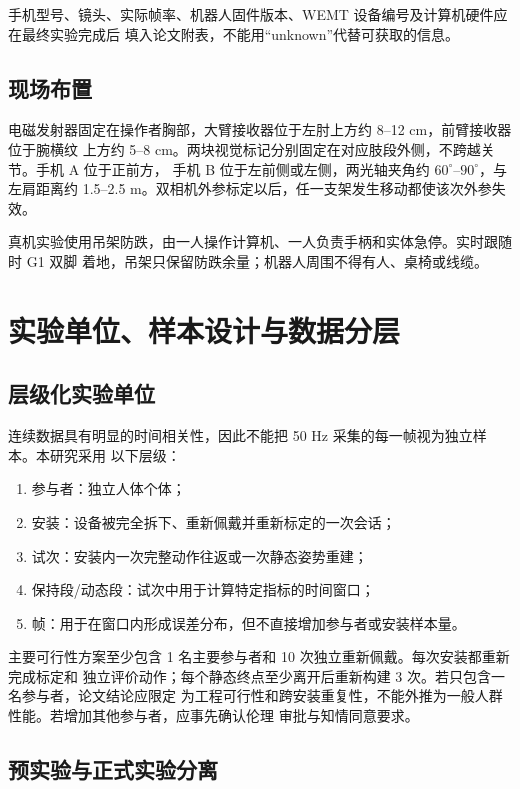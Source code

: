 手机型号、镜头、实际帧率、机器人固件版本、WEMT 设备编号及计算机硬件应在最终实验完成后
填入论文附表，不能用“unknown”代替可获取的信息。

\subsection{现场布置}
\label{subsec:ch6_physical_layout}

电磁发射器固定在操作者胸部，大臂接收器位于左肘上方约 8--12 cm，前臂接收器位于腕横纹
上方约 5--8 cm。两块视觉标记分别固定在对应肢段外侧，不跨越关节。手机 A 位于正前方，
手机 B 位于左前侧或左侧，两光轴夹角约 $60^\circ$--$90^\circ$，与左肩距离约
1.5--2.5 m。双相机外参标定以后，任一支架发生移动都使该次外参失效。

真机实验使用吊架防跌，由一人操作计算机、一人负责手柄和实体急停。实时跟随时 G1 双脚
着地，吊架只保留防跌余量；机器人周围不得有人、桌椅或线缆。

\section{实验单位、样本设计与数据分层}
\label{sec:ch6_sampling_design}

\subsection{层级化实验单位}
\label{subsec:ch6_hierarchical_units}

连续数据具有明显的时间相关性，因此不能把 50 Hz 采集的每一帧视为独立样本。本研究采用
以下层级：
\begin{enumerate}[label=\arabic*)]
  \item 参与者：独立人体个体；
  \item 安装：设备被完全拆下、重新佩戴并重新标定的一次会话；
  \item 试次：安装内一次完整动作往返或一次静态姿势重建；
  \item 保持段/动态段：试次中用于计算特定指标的时间窗口；
  \item 帧：用于在窗口内形成误差分布，但不直接增加参与者或安装样本量。
\end{enumerate}

主要可行性方案至少包含 1 名主要参与者和 10 次独立重新佩戴。每次安装都重新完成标定和
独立评价动作；每个静态终点至少离开后重新构建 3 次。若只包含一名参与者，论文结论应限定
为工程可行性和跨安装重复性，不能外推为一般人群性能。若增加其他参与者，应事先确认伦理
审批与知情同意要求。

\subsection{预实验与正式实验分离}
\label{subsec:ch6_pilot_formal_separation}

